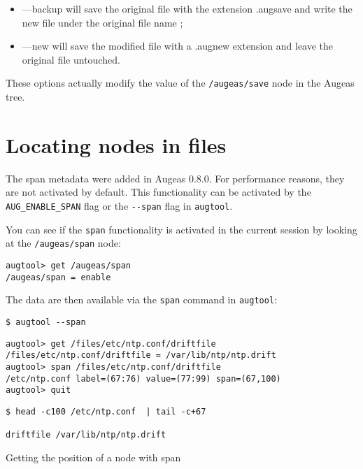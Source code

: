 \begin{itemize}
\item
  ---backup will save the original file with the extension .augsave and write the new file under the original file name ;
\item
  ---new will save the modified file with a .augnew extension and leave the original file untouched.
\end{itemize}
These options actually modify the value of the \nolinkurl{/augeas/save} node in the Augeas tree.

\section{Locating nodes in files}

\label{sec:locating_nodes}  

The span metadata were added in Augeas 0.8.0. For performance reasons, they are not activated by default. This functionality can be activated by the \verb!AUG_ENABLE_SPAN! flag or the \verb!--span! flag in \verb!augtool!.

You can see if the \verb!span! functionality is activated in the current session by looking at the \nolinkurl{/augeas/span} node:


\begin{verbatim}
augtool> get /augeas/span
/augeas/span = enable
\end{verbatim}

The data are then available via the \verb!span! command in \verb!augtool!:


\begin{listing}
  \begin{verbatim}
$ augtool --span
  \end{verbatim}
  \begin{verbatim}
augtool> get /files/etc/ntp.conf/driftfile
/files/etc/ntp.conf/driftfile = /var/lib/ntp/ntp.drift
augtool> span /files/etc/ntp.conf/driftfile
/etc/ntp.conf label=(67:76) value=(77:99) span=(67,100)
augtool> quit
  \end{verbatim}
  \begin{verbatim}
$ head -c100 /etc/ntp.conf  | tail -c+67

driftfile /var/lib/ntp/ntp.drift
  \end{verbatim}
  \caption{Getting the position of a node with span}
  \label{lst:span_ntp}
\end{listing}

